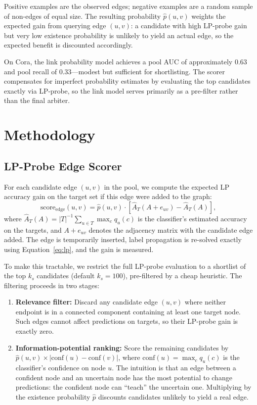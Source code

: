 \documentclass[12pt,a4paper,oneside]{report}
\begin{document}
Positive examples are the observed edges; negative examples are a random sample of non-edges of equal size. The resulting probability $\hat{p}(u,v)$ weights the expected gain from querying edge $(u,v)$: a candidate with high LP-probe gain but very low existence probability is unlikely to yield an actual edge, so the expected benefit is discounted accordingly.

On Cora, the link probability model achieves a pool AUC of approximately 0.63 and pool recall of 0.33---modest but sufficient for shortlisting. The scorer compensates for imperfect probability estimates by evaluating the top candidates exactly via LP-probe, so the link model serves primarily as a pre-filter rather than the final arbiter.


\chapter{Methodology}
\label{ch:method}

\section{LP-Probe Edge Scorer}

For each candidate edge $(u, v)$ in the pool, we compute the expected LP accuracy gain on the target set if this edge were added to the graph:
\begin{equation}
    \text{score}_{\text{edge}}(u,v) = \hat{p}(u,v) \cdot \left[ \hat{A}_T(A + e_{uv}) - \hat{A}_T(A) \right],
\end{equation}
where $\hat{A}_T(A) = |T|^{-1} \sum_{u \in T} \max_c q_u(c)$ is the classifier's estimated accuracy on the targets, and $A + e_{uv}$ denotes the adjacency matrix with the candidate edge added. The edge is temporarily inserted, label propagation is re-solved exactly using Equation~\eqref{eq:lp}, and the gain is measured.

To make this tractable, we restrict the full LP-probe evaluation to a shortlist of the top $k_s$ candidates (default $k_s = 100$), pre-filtered by a cheap heuristic. The filtering proceeds in two stages:
\begin{enumerate}[leftmargin=2em]
    \item \textbf{Relevance filter:} Discard any candidate edge $(u,v)$ where neither endpoint is in a connected component containing at least one target node. Such edges cannot affect predictions on targets, so their LP-probe gain is exactly zero.
    \item \textbf{Information-potential ranking:} Score the remaining candidates by $\hat{p}(u,v) \times |\text{conf}(u) - \text{conf}(v)|$, where $\text{conf}(u) = \max_c q_u(c)$ is the classifier's confidence on node $u$. The intuition is that an edge between a confident node and an uncertain node has the most potential to change predictions: the confident node can ``teach'' the uncertain one. Multiplying by the existence probability $\hat{p}$ discounts candidates unlikely to yield a real edge.
\end{enumerate}
\end{document}
